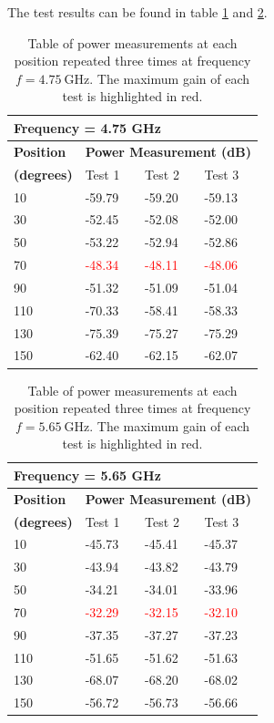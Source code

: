 The test results can be found in table \ref{tab:a2_2a} and \ref{tab:a2_2b}.
\begin{table}[H]
    \centering
    \begin{tabular}{l|l|l|l}
        \multicolumn{4}{l}{\textbf{Frequency = 4.75 GHz}}         \\
        \hline
        \textbf{Position} & \multicolumn{3}{l}{\textbf{Power Measurement (dB)}} \\
        \textbf{(degrees)}  & Test 1    & Test 2  & Test 3  \\
        \hline
        \hline
        10      & -59.79    & -59.20    & -59.13 \\
        30      & -52.45    & -52.08    & -52.00 \\
        50      & -53.22    & -52.94    & -52.86 \\
        70      & \textcolor{red}{-48.34}    & \textcolor{red}{-48.11}    & \textcolor{red}{-48.06} \\
        90      & -51.32    & -51.09    & -51.04 \\
        110     & -70.33    & -58.41    & -58.33 \\
        130     & -75.39    & -75.27    & -75.29 \\
        150     & -62.40    & -62.15    & -62.07
        \end{tabular}
    \caption{Table of power measurements at each position repeated three times at frequency $f=\SI{4.75}{\giga\hertz}$. The maximum gain of each test is highlighted in red.}
    \label{tab:a2_2a}
\end{table}

\begin{table}[H]
    \centering
    \begin{tabular}{l|l|l|l}
        \multicolumn{4}{l}{\textbf{Frequency = 5.65 GHz}}         \\
        \hline
        \textbf{Position} & \multicolumn{3}{l}{\textbf{Power Measurement (dB)}} \\
        \textbf{(degrees)}  & Test 1    & Test 2  & Test 3  \\
        \hline
        \hline
        10      & -45.73    & -45.41    & -45.37 \\
        30      & -43.94    & -43.82    & -43.79 \\
        50      & -34.21    & -34.01    & -33.96 \\
        70      & \textcolor{red}{-32.29}    & \textcolor{red}{-32.15}    & \textcolor{red}{-32.10} \\
        90      & -37.35    & -37.27    & -37.23 \\
        110     & -51.65    & -51.62    & -51.63 \\
        130     & -68.07    & -68.20    & -68.02 \\
        150     & -56.72    & -56.73    & -56.66
        \end{tabular}
    \caption{Table of power measurements at each position repeated three times at frequency $f=\SI{5.65}{\giga\hertz}$. The maximum gain of each test is highlighted in red.}
    \label{tab:a2_2b}
\end{table}

